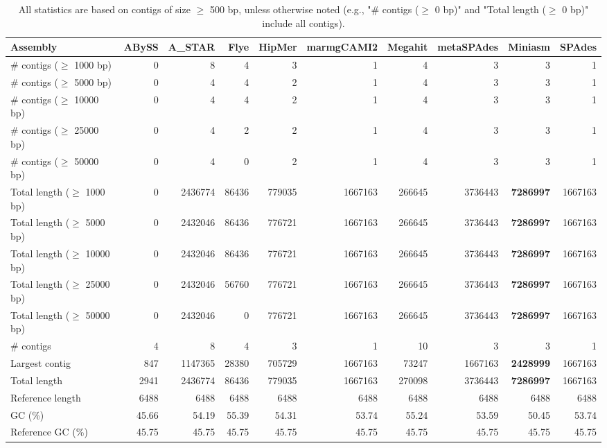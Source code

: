 \documentclass[12pt,a4paper]{article}
\begin{document}
\begin{table}[ht]
\begin{center}
\caption{All statistics are based on contigs of size $\geq$ 500 bp, unless otherwise noted (e.g., "\# contigs ($\geq$ 0 bp)" and "Total length ($\geq$ 0 bp)" include all contigs).}
\begin{tabular}{|l*{9}{|r}|}
\hline
Assembly & ABySS & A\_STAR & Flye & HipMer & marmgCAMI2 & Megahit & metaSPAdes & Miniasm & SPAdes \\ \hline
\# contigs ($\geq$ 1000 bp) & 0 & 8 & 4 & 3 & 1 & 4 & 3 & 3 & 1 \\ \hline
\# contigs ($\geq$ 5000 bp) & 0 & 4 & 4 & 2 & 1 & 4 & 3 & 3 & 1 \\ \hline
\# contigs ($\geq$ 10000 bp) & 0 & 4 & 4 & 2 & 1 & 4 & 3 & 3 & 1 \\ \hline
\# contigs ($\geq$ 25000 bp) & 0 & 4 & 2 & 2 & 1 & 4 & 3 & 3 & 1 \\ \hline
\# contigs ($\geq$ 50000 bp) & 0 & 4 & 0 & 2 & 1 & 4 & 3 & 3 & 1 \\ \hline
Total length ($\geq$ 1000 bp) & 0 & 2436774 & 86436 & 779035 & 1667163 & 266645 & 3736443 & {\bf 7286997} & 1667163 \\ \hline
Total length ($\geq$ 5000 bp) & 0 & 2432046 & 86436 & 776721 & 1667163 & 266645 & 3736443 & {\bf 7286997} & 1667163 \\ \hline
Total length ($\geq$ 10000 bp) & 0 & 2432046 & 86436 & 776721 & 1667163 & 266645 & 3736443 & {\bf 7286997} & 1667163 \\ \hline
Total length ($\geq$ 25000 bp) & 0 & 2432046 & 56760 & 776721 & 1667163 & 266645 & 3736443 & {\bf 7286997} & 1667163 \\ \hline
Total length ($\geq$ 50000 bp) & 0 & 2432046 & 0 & 776721 & 1667163 & 266645 & 3736443 & {\bf 7286997} & 1667163 \\ \hline
\# contigs & 4 & 8 & 4 & 3 & 1 & 10 & 3 & 3 & 1 \\ \hline
Largest contig & 847 & 1147365 & 28380 & 705729 & 1667163 & 73247 & 1667163 & {\bf 2428999} & 1667163 \\ \hline
Total length & 2941 & 2436774 & 86436 & 779035 & 1667163 & 270098 & 3736443 & {\bf 7286997} & 1667163 \\ \hline
Reference length & 6488 & 6488 & 6488 & 6488 & 6488 & 6488 & 6488 & 6488 & 6488 \\ \hline
GC (\%) & 45.66 & 54.19 & 55.39 & 54.31 & 53.74 & 55.24 & 53.59 & 50.45 & 53.74 \\ \hline
Reference GC (\%) & 45.75 & 45.75 & 45.75 & 45.75 & 45.75 & 45.75 & 45.75 & 45.75 & 45.75 \\ \hline

\end{tabular}
\end{center}
\end{table}
\end{document}
